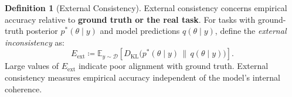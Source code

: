 \documentclass{article}
\theoremstyle{definition}
\newtheorem{definition}{Definition}
\begin{document}

\begin{definition}[External Consistency]
External consistency concerns empirical accuracy relative to \textbf{ground truth or the real task}.
For tasks with ground-truth posterior $p^{\ast}(\theta \mid y)$ and model predictions $q(\theta \mid y)$, define the \emph{external inconsistency} as:
\[
E_{\mathrm{ext}} \coloneqq \mathbb{E}_{y \sim \mathcal{D}} \left[ D_{\mathrm{KL}}\big(p^{\ast}(\theta \mid y) \,\|\, q(\theta \mid y)\big) \right].
\]
Large values of $E_{\mathrm{ext}}$ indicate poor alignment with ground truth. External consistency measures empirical accuracy independent of the model's internal coherence.
\end{definition}
\end{document}
